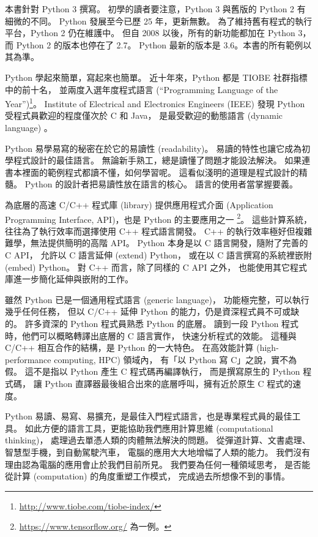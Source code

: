 \documentclass[a4paper,12pt]{book}
\theoremstyle{definition}
\begin{document}
本書針對 Python 3 撰寫。
初學的讀者要注意，Python 3 與舊版的 Python 2 有細微的不同。
Python 發展至今已歷 25 年，更新無數。
為了維持舊有程式的執行平台，Python 2 仍在維護中。
但自 2008 以後，所有的新功能都加在 Python 3，而 Python 2 的版本也停在了 2.7。
Python 最新的版本是 3.6。本書的所有範例以其為準。

Python 學起來簡單，寫起來也簡單。
近十年來，Python 都是 TIOBE 社群指標中的前十名，
並兩度入選年度程式語言
(``Programming Language of the Year'')\footnote{\url{http://www.tiobe.com/tiobe-index/}}。
Institute of Electrical and Electronics Engineers (IEEE) 發現
Python 受程式員歡迎的程度僅次於 C 和 Java，
是最受歡迎的動態語言 (dynamic language) \cite{cass_interactive:_2016}。

Python 易學易寫的秘密在於它的易讀性 (readability)。
易讀的特性也讓它成為初學程式設計的最佳語言。
無論新手熟工，總是讀懂了問題才能設法解決。
如果連書本裡面的範例程式都讀不懂，如何學習呢。
這看似淺明的道理是程式設計的精髓。
Python 的設計者把易讀性放在語言的核心。
語言的使用者當掌握要義。

為底層的高速 C/C++ 程式庫 (library) 提供應用程式介面 
(Application Programming Interface, API)，也是 Python 的主要應用之一%
\footnote{\url{https://www.tensorflow.org/} 為一例。}。
這些計算系統，往往為了執行效率而選擇使用 C++ 程式語言開發。
C++ 的執行效率極好但複雜難學，無法提供簡明的高階 API。
Python 本身是以 C 語言開發，隨附了完善的 C API，
允許以 C 語言延伸 (extend) Python，
或在以 C 語言撰寫的系統裡嵌附 (embed) Python。
對 C++ 而言，除了同樣的 C API 之外，
也能使用其它程式庫進一步簡化延伸與嵌附的工作。

雖然 Python 已是一個通用程式語言 (generic language)，
功能極完整，可以執行幾乎任何任務，
但以 C/C++ 延伸 Python 的能力，仍是資深程式員不可或缺的。
許多資深的 Python 程式員熟悉 Python 的底層。
讀到一段 Python 程式時，他們可以概略轉譯出底層的 C 語言實作，
快速分析程式的效能。
這種與 C/C++ 相互合作的結構，是 Python 的一大特色。
在高效能計算 (high-performance computing, HPC) 領域內，
有「以 Python 寫 C」之說，實不為假。
這不是指以 Python 產生 C 程式碼再編譯執行，
而是撰寫原生的 Python 程式碼，
讓 Python 直譯器最後組合出來的底層呼叫，擁有近於原生 C 程式的速度。

Python 易讀、易寫、易擴充，是最佳入門程式語言，也是專業程式員的最佳工具。
如此方便的語言工具，更能協助我們應用計算思維 (computational thinking)，
處理過去單憑人類的肉體無法解決的問題。
從彈道計算、文書處理、智慧型手機，到自動駕駛汽車，
電腦的應用大大地增幅了人類的能力。
我們沒有理由認為電腦的應用會止於我們目前所見。
我們要為任何一種領域思考，
是否能從計算 (computation) 的角度重塑工作模式，
完成過去所想像不到的事情。
\end{document}
